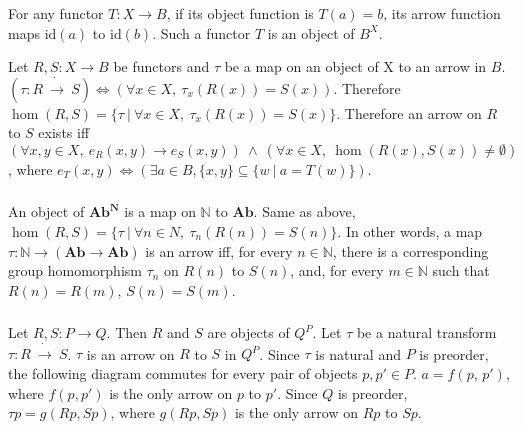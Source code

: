 \documentclass[luatex]{article}
\begin{document}
\subsubsection{}



\showArt

For any functor $T : X \rightarrow B$, if its object function is $T(a) = b$, its arrow function maps $\mathrm{id}(a)$ to $\mathrm{id}(b)$. Such a functor $T$ is an object of $B^X$.

Let $R, S : X \rightarrow B$ be functors and $\tau$ be a map on an object of X to an arrow in $B$. $(\tau : R\ \dot{\rightarrow}\ S) \Leftrightarrow (\forall x \in X,\ \tau_x(R(x)) = S(x))$. Therefore $\hom(R, S) = \{\tau\ |\ \forall x \in X,\ \tau_x(R(x)) = S(x)\}$. Therefore an arrow on $R$ to $S$ exists iff $(\forall x, y \in X,\ e_R(x, y) \rightarrow e_S(x, y))\ \wedge\ (\forall x \in X,\ \hom(R(x), S(x)) \neq \emptyset)$, where $e_T(x, y) \Leftrightarrow (\exists a \in B, \{x, y\} \subseteq \{ w\ |\ a = T(w) \})$.

\subsubsection{}



\showArt

An object of $\mathbf{Ab}^{\mathbf{N}}$ is a map on $\mathbb{N}$ to $\mathbf{Ab}$. Same as above, $\hom(R, S) = \{\tau\ |\ \forall n \in N,\ \tau_n(R(n)) = S(n)\}$. In other words, a map $\tau : \mathbb{N} \rightarrow (\mathbf{Ab} \rightarrow \mathbf{Ab})$ is an arrow iff, for every $n \in \mathbb{N}$, there is a corresponding group homomorphism $\tau_n$ on $R(n)$ to $S(n)$, and, for every $m \in \mathbb{N}$ such that $R(n) = R(m)$, $S(n) = S(m)$. 

\subsubsection{}



\showArt

Let $R, S : P \rightarrow Q$. Then $R$ and $S$ are objects of $Q^P$. Let $\tau$ be a natural transform $\tau : R\ \dot{\rightarrow}\ S$. $\tau$ is an arrow on $R$ to $S$ in $Q^P$. Since $\tau$ is natural and $P$ is preorder, the following diagram commutes for every pair of objects $p, p' \in P$. $a = f(p,\,p')$, where $f(p, p')$ is the only arrow on $p$ to $p'$. Since $Q$ is preorder, $\tau p = g(Rp, Sp)$, where $g(Rp, Sp)$ is the only arrow on $Rp$ to $Sp$.
\end{document}
